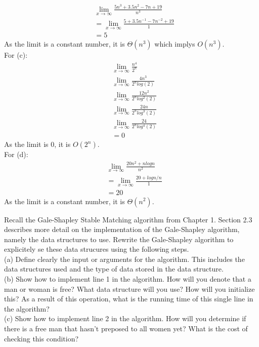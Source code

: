 \documentclass{assignment}
\begin{document}
\begin{problemlist}
\begin{answer}
\begin{align*}
&\lim_{x \to \infty} \frac{5n^3+3.5n^2-7n+19}{n^3}\\
&=\lim_{x \to \infty} \frac{5+3.5n^{-1}-7n^{-2}+19}{1}\\
&=5
\end{align*}
As the limit is a constant number, it is $\Theta (n^3)$ which implys $O(n^3)$.\\
For (c):\\
\begin{align*}
&\lim_{x \to \infty} \frac{n^4}{2^n}\\
&\lim_{x \to \infty} \frac{4n^3}{2^nlog(2)}\\
&\lim_{x \to \infty} \frac{12n^2}{2^nlog^2(2)}\\
&\lim_{x \to \infty} \frac{24n}{2^nlog^3(2)}\\
&\lim_{x \to \infty} \frac{24}{2^nlog^4(2)}\\
&=0
\end{align*}
As the limit is 0, it is $O(2^n)$.\\
\clearpage
For (d):\\
\begin{align*}
&\lim_{x \to \infty} \frac{20n^2+nlogn}{n^2}\\
&=\lim_{x \to \infty} \frac{20+logn/n}{1}\\
&=20
\end{align*}
As the limit is a constant number, it is $\Theta (n^2)$.\\
\end{answer}
\clearpage
\pbitem
\begin{problem}
\end{problem}
Recall the Gale-Shapley Stable Matching algorithm from Chapter 1. Section 2.3 describes more detail on the implementation of the Gale-Shapley algorithm, namely the data structures to use. Rewrite the Gale-Shapley algorithm to explicitely se these data strucures using the following steps.\\
(a) Define clearly the input or arguments for the algorithm. This includes the data structures used and the type of data stored in the data structure.\\
(b) Show how to implement line 1 in the algorithm. How will you denote that a man or woman is free? What data structure will you use? How will you initialize this? As a result of this operation, what is the running time of this single line in the algorithm?\\
(c) Show how to implement line 2 in the algorithm. How will you determine if there is a free man that hasn't preposed to all women yet? What is the cost of checking this condition?\\

\end{problemlist}
\end{document}
